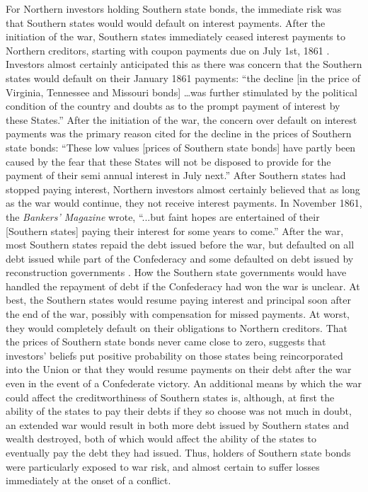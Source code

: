 For Northern investors holding Southern state bonds, the immediate risk was that Southern states would would default on interest payments.
After the initiation of the war, Southern states immediately ceased interest payments to Northern creditors, starting with coupon payments due on July 1st, 1861 \parencites[947]{BankersMagazine1860}[159]{BankersMagazine1862}.
Investors almost certainly anticipated this as there was concern that the Southern states would default on their January 1861 payments: ``the decline [in the price of Virginia, Tennessee and Missouri bonds] \dots was further stimulated by the political condition of the country and doubts as to the prompt payment of interest by these States.'' \parencite[756]{BankersMagazine1860}
After the initiation of the war, the concern over default on interest payments was the primary reason cited for the decline in the prices of Southern state bonds: ``These low values [prices of Southern state bonds] have partly been caused by the fear that these States will not be disposed to provide for the payment of their semi annual interest in July next.'' \parencite[947]{BankersMagazine1860}
After Southern states had stopped paying interest, Northern investors almost certainly believed that as long as the war would continue, they not receive interest payments.
In November 1861, the \textit{Bankers' Magazine} wrote, ``...but faint hopes are entertained of their [Southern states] paying their interest for some years to come.'' \parencite[559]{BankersMagazine1862}
After the war, most Southern states repaid the debt issued before the war, but defaulted on all debt issued while part of the Confederacy and some defaulted on debt issued by reconstruction governments \parencites{Randolph1931}{Ratchford1941}.
How the Southern state governments would have handled the repayment of debt if the Confederacy had won the war is unclear.
At best, the Southern states would resume paying interest and principal soon after the end of the war, possibly with compensation for missed payments.
At worst, they would completely default on their obligations to Northern creditors.
That the prices of Southern state bonds never came close to zero, suggests that investors' beliefs put positive probability on those states being reincorporated into the Union or that they would resume payments on their debt after the war even in the event of a Confederate victory.
An additional means by which the war could affect the creditworthiness of Southern states is, although, at first the ability of the states to pay their debts if they so choose was not much in doubt, an extended war would result in both more debt issued by Southern states and wealth destroyed, both of which would affect the ability of the states to eventually pay the debt they had issued.
Thus, holders of Southern state bonds were particularly exposed to war risk, and almost certain to suffer losses immediately at the onset of a conflict.


